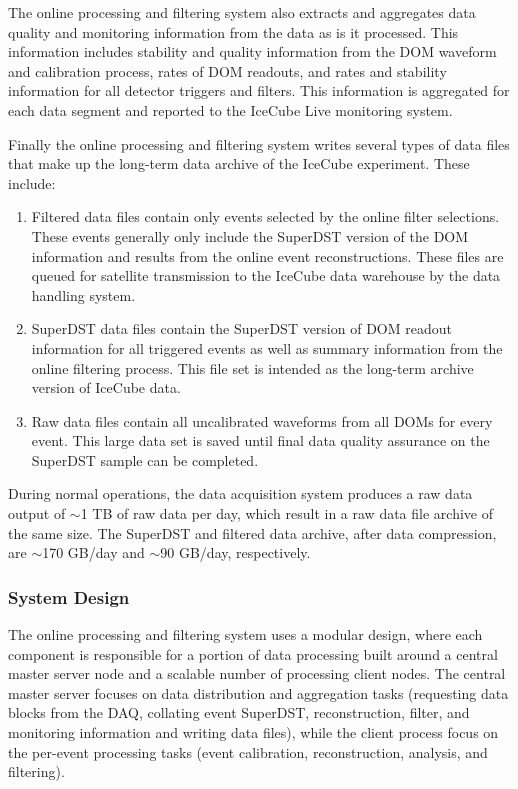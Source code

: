 The online processing and filtering system also extracts and aggregates data quality and monitoring information
from the data as is it processed.  This information includes stability and quality information from the
DOM waveform and calibration process, rates of DOM readouts, and rates and stability
information for all detector triggers and filters.  This information is aggregated for each data segment and
reported to the IceCube Live monitoring system.

Finally the online processing and filtering system writes several
types of data files that make up the long-term data archive of the IceCube
experiment.  These include:
\begin{enumerate}
\item Filtered data files contain only events selected by the online filter selections.  These events
generally only include the SuperDST version of the DOM information and results from the online event reconstructions.  These
files are queued for satellite transmission to the IceCube data warehouse by the data handling system.
\item SuperDST data files contain the SuperDST version of DOM readout information for all triggered events as well as summary
information from the online filtering process.  This file set is intended as the long-term archive version of IceCube data.
\item Raw data files contain all uncalibrated waveforms from all DOMs for every event.  This large data
set is saved until final data quality assurance on the SuperDST sample can be completed.
\end{enumerate}

During normal operations, the data acquisition system produces a raw data output of $\sim$1 TB of raw data per day, which result in
a raw data file archive of the same size.  The SuperDST  and filtered data archive, after data compression, are $\sim$170 GB/day and $\sim$90 GB/day,
respectively.
\subsubsection{System Design}

The online processing and filtering system uses a modular design, where each component
is responsible for a portion of data processing built around a central master server node and a
scalable number of processing client nodes.  The central master server focuses on
data distribution and aggregation tasks (requesting data blocks from the DAQ, collating event SuperDST, reconstruction, filter,
and monitoring information and writing data files), while the client process focus on the per-event
processing tasks (event calibration, reconstruction, analysis, and filtering).  

